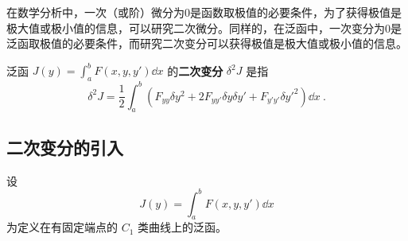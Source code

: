 

在数学分析中，一次（或阶）微分为0是函数取极值的必要条件，为了获得极值是极大值或极小值的信息，可以研究二次微分。同样的，在泛函中，一次变分为0是泛函取极值的必要条件，而研究二次变分可以获得极值是极大值或极小值的信息。

泛函 $J(y)=\int_a^bF(x,y,y')\dd x$ 的\textbf{二次变分} $\delta^2J$ 是指
\begin{equation}
\delta^2J=\frac{1}{2}\int_a^b(F_{yy}\delta y^2+2F_{yy'}\delta y\delta y'+F_{y'y'}\delta y'^2)\dd x~.
\end{equation}
\subsection{二次变分的引入}
设 
\begin{equation}
J(y)=\int_a^bF(x,y,y')\dd x
\end{equation}
为定义在有固定端点的 $C_1$ 类曲线上的泛函。

